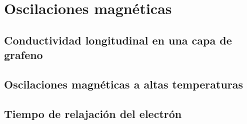 \section[Oscilaciones]{Oscilaciones magnéticas}
\subsection{Conductividad longitudinal en una capa de grafeno}
\subsection{Oscilaciones magnéticas a altas temperaturas}
\subsection{Tiempo de relajación del electrón}